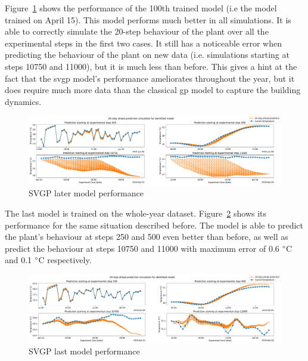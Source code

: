 \clearpage

Figure~\ref{fig:SVGP_later_model_performance} shows the performance of the 100th
trained model (i.e the model trained on April 15). This model performs much
better in all simulations. It is able to correctly simulate the 20-step
behaviour of the plant over all the experimental steps in the first two cases.
It still has a noticeable error when predicting the behaviour of the plant on
new data (i.e. simulations starting at steps 10750 and 11000), but it is much
less than before. This gives a hint at the fact that the \acrshort{svgp} model's
performance ameliorates throughout the year, but it does require much more data
than the classical \acrshort{gp} model to capture the building dynamics.

\begin{figure}[ht]
    \centering
    \includegraphics[width =
    \textwidth]{Plots/1_SVGP_480pts_inf_window_12_averageYear_later_model_performance.pdf}
    \caption{SVGP later model performance}
    \label{fig:SVGP_later_model_performance}
\end{figure}

The last model is trained on the whole-year dataset.
Figure~\ref{fig:SVGP_last_model_performance} shows its performance for the same
situation described before. The model is able to predict the plant's behaviour
at steps 250 and 500 even better than before, as well as predict the behaviour
at steps 10750 and 11000 with maximum error of 0.6 $\degree$C and 0.1 $\degree$C
respectively.

\begin{figure}[ht]
    \centering
    \includegraphics[width =
    \textwidth]{Plots/1_SVGP_480pts_inf_window_12_averageYear_last_model_performance.pdf}
    \caption{SVGP last model performance}
    \label{fig:SVGP_last_model_performance}
\end{figure}

